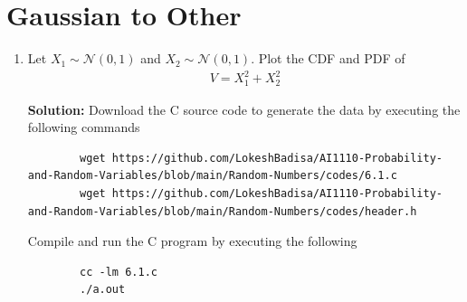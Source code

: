 \documentclass[journal,12pt,twocolumn]{IEEEtran}
\newcommand{\solution}{\noindent \textbf{Solution: }}
\providecommand{\gauss}[2]{\mathcal{N}\ensuremath{\left(#1,#2\right)}}
\numberwithin{equation}{section}
\renewcommand\thesection{\arabic{section}}
\begin{document}
	\section{Gaussian to Other}
	\begin{enumerate}[label=\thesection.\arabic*,ref=\thesection.\theenumi]
	\item Let $X_1 \sim  \gauss{0}{1}$ and $X_2 \sim  \gauss{0}{1}$. Plot the CDF and PDF of
	\begin{align}
		V = X_1^2 + X_2^2
	\end{align}
	
	\solution Download the C source code to generate the data by executing the following commands
	\begin{lstlisting}
		wget https://github.com/LokeshBadisa/AI1110-Probability-and-Random-Variables/blob/main/Random-Numbers/codes/6.1.c
		wget https://github.com/LokeshBadisa/AI1110-Probability-and-Random-Variables/blob/main/Random-Numbers/codes/header.h
	\end{lstlisting}
	Compile and run the C program by executing the following
	\begin{lstlisting}
		cc -lm 6.1.c
		./a.out
	\end{lstlisting}
	

\end{enumerate}
\end{document}

